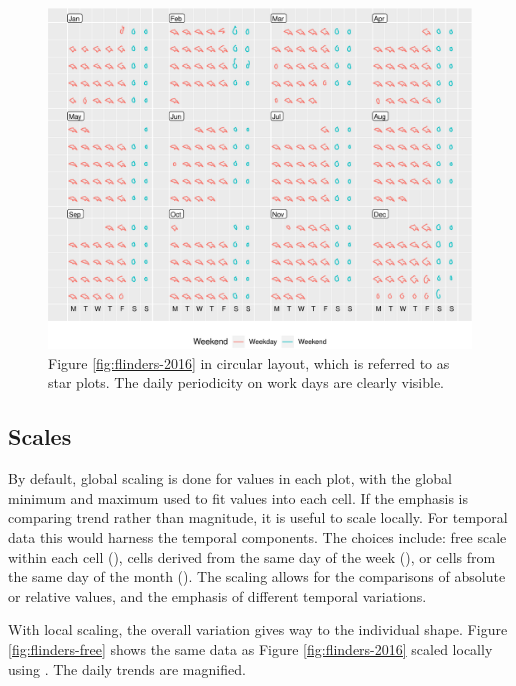 \begin{Schunk}
\begin{figure}

{\centering \includegraphics[width=\textwidth]{figure/flinders-polar-1} 

}

\caption{Figure \ref{fig:flinders-2016} in circular layout, which is referred to as star plots. The daily periodicity on work days are clearly visible.}\label{fig:flinders-polar}
\end{figure}
\end{Schunk}

\hypertarget{scales}{%
\subsection{Scales}\label{scales}}

By default, global scaling is done for values in each plot, with the
global minimum and maximum used to fit values into each cell. If the
emphasis is comparing trend rather than magnitude, it is useful to scale
locally. For temporal data this would harness the temporal components.
The choices include: free scale within each cell (), cells
derived from the same day of the week (), or cells from
the same day of the month (). The scaling allows for
the comparisons of absolute or relative values, and the emphasis of
different temporal variations.

With local scaling, the overall variation gives way to the individual
shape. Figure \ref{fig:flinders-free} shows the same data as Figure
\ref{fig:flinders-2016} scaled locally using . The
daily trends are magnified.

